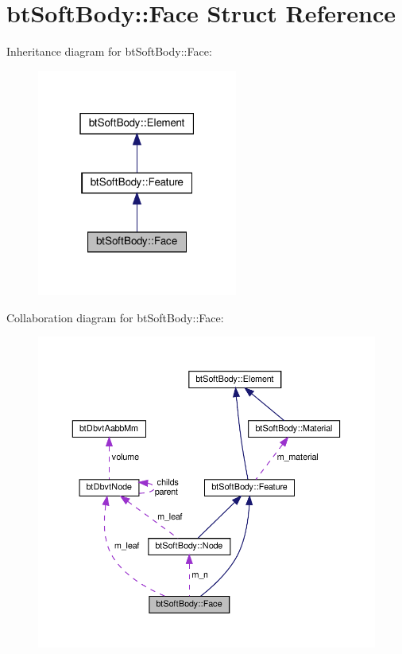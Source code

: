 \hypertarget{structbtSoftBody_1_1Face}{}\section{bt\+Soft\+Body\+:\+:Face Struct Reference}
\label{structbtSoftBody_1_1Face}


Inheritance diagram for bt\+Soft\+Body\+:\+:Face\+:
\nopagebreak
\begin{figure}[H]
\begin{center}
\leavevmode
\includegraphics[width=187pt]{structbtSoftBody_1_1Face__inherit__graph}
\end{center}
\end{figure}


Collaboration diagram for bt\+Soft\+Body\+:\+:Face\+:
\nopagebreak
\begin{figure}[H]
\begin{center}
\leavevmode
\includegraphics[width=350pt]{structbtSoftBody_1_1Face__coll__graph}
\end{center}
\end{figure}
